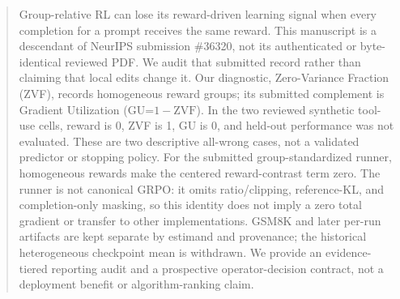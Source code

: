 \begin{abstract}
Group-relative RL can lose its reward-driven learning signal when every
completion for a prompt receives the same reward. This manuscript is a
descendant of NeurIPS submission \#36320, not its authenticated or byte-identical
reviewed PDF. We audit that submitted record rather than claiming that local edits
change it. Our diagnostic, Zero-Variance Fraction (ZVF), records homogeneous reward
groups; its submitted complement is Gradient Utilization (GU=$1-\mathrm{ZVF}$).
In the two reviewed synthetic tool-use cells, reward is 0, ZVF is 1, GU is 0,
and held-out performance was not evaluated. These are two descriptive all-wrong
cases, not a validated predictor or stopping policy. For the submitted
group-standardized runner, homogeneous rewards make the centered reward-contrast
term zero. The runner is not canonical GRPO: it omits ratio/clipping, reference-KL,
and completion-only masking, so this identity does not imply a zero total gradient
or transfer to other implementations. GSM8K and later per-run artifacts are kept
separate by estimand and provenance; the historical heterogeneous checkpoint mean
is withdrawn. We provide an evidence-tiered reporting audit and a prospective
operator-decision contract, not a deployment benefit or algorithm-ranking claim.
\end{abstract}
